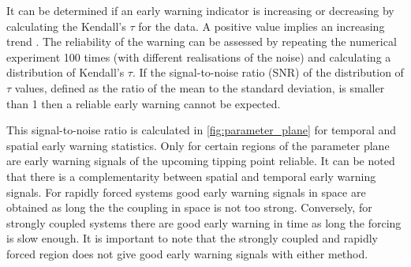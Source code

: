 It can be determined if an early warning indicator is increasing or decreasing by calculating the Kendall's $\tau$ for the data.
A positive value implies an increasing trend \parencite{Wilks2011}. The reliability of the warning can be assessed by repeating the numerical
experiment 100 times (with different realisations of the noise) and calculating a distribution of Kendall's $\tau$. If the signal-to-noise ratio
(SNR) of the distribution of $\tau$ values, defined as the ratio of the mean to the standard deviation, is smaller than 1 then a reliable early warning cannot be expected.

This signal-to-noise ratio is calculated in \cref{fig:parameter_plane} for temporal and spatial early warning statistics. Only for
certain regions of the parameter plane are early warning signals of the upcoming tipping point reliable. It can be noted that there is a complementarity between spatial
and temporal early warning signals. For rapidly forced systems good early warning signals in space are obtained as long the
the coupling in space is not too strong. Conversely, for strongly coupled systems there are good early warning in time as long the forcing is slow enough. It is important to note that
the strongly coupled and rapidly forced region does not give good early warning signals with either method.

